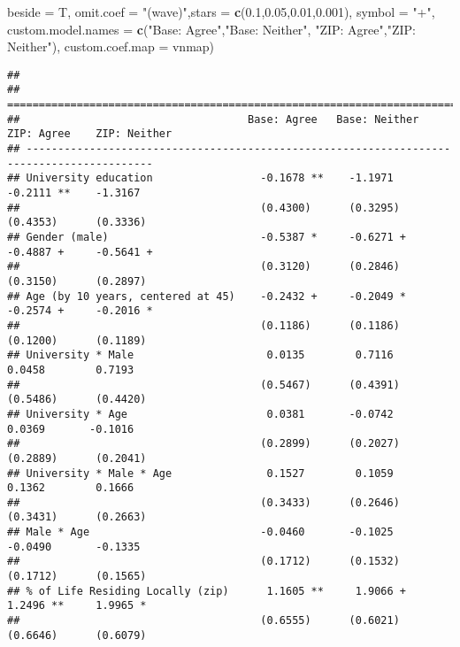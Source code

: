 \documentclass[
]{article}
\newenvironment{Shaded}{\begin{snugshade}}{\end{snugshade}}
\newcommand{\DataTypeTok}[1]{\textcolor[rgb]{0.13,0.29,0.53}{#1}}
\newcommand{\FloatTok}[1]{\textcolor[rgb]{0.00,0.00,0.81}{#1}}
\newcommand{\KeywordTok}[1]{\textcolor[rgb]{0.13,0.29,0.53}{\textbf{#1}}}
\newcommand{\NormalTok}[1]{#1}
\newcommand{\StringTok}[1]{\textcolor[rgb]{0.31,0.60,0.02}{#1}}
\begin{document}
\begin{Shaded}
\begin{Highlighting}[]
          \DataTypeTok{beside =}\NormalTok{ T,}
          \DataTypeTok{omit.coef =} \StringTok{"(wave)"}\NormalTok{,}\DataTypeTok{stars =} \KeywordTok{c}\NormalTok{(}\FloatTok{0.1}\NormalTok{,}\FloatTok{0.05}\NormalTok{,}\FloatTok{0.01}\NormalTok{,}\FloatTok{0.001}\NormalTok{), }\DataTypeTok{symbol =} \StringTok{"+"}\NormalTok{, }
          \DataTypeTok{custom.model.names =} \KeywordTok{c}\NormalTok{(}\StringTok{"Base: Agree"}\NormalTok{,}\StringTok{"Base: Neither"}\NormalTok{,}
                                 \StringTok{"ZIP: Agree"}\NormalTok{,}\StringTok{"ZIP: Neither"}\NormalTok{),}
          \DataTypeTok{custom.coef.map =}\NormalTok{ vnmap)}
\end{Highlighting}
\end{Shaded}

\begin{verbatim}
## 
## ==========================================================================================
##                                    Base: Agree   Base: Neither  ZIP: Agree    ZIP: Neither
## ------------------------------------------------------------------------------------------
## University education                 -0.1678 **    -1.1971        -0.2111 **    -1.3167   
##                                      (0.4300)      (0.3295)       (0.4353)      (0.3336)  
## Gender (male)                        -0.5387 *     -0.6271 +      -0.4887 +     -0.5641 + 
##                                      (0.3120)      (0.2846)       (0.3150)      (0.2897)  
## Age (by 10 years, centered at 45)    -0.2432 +     -0.2049 *      -0.2574 +     -0.2016 * 
##                                      (0.1186)      (0.1186)       (0.1200)      (0.1189)  
## University * Male                     0.0135        0.7116         0.0458        0.7193   
##                                      (0.5467)      (0.4391)       (0.5486)      (0.4420)  
## University * Age                      0.0381       -0.0742         0.0369       -0.1016   
##                                      (0.2899)      (0.2027)       (0.2889)      (0.2041)  
## University * Male * Age               0.1527        0.1059         0.1362        0.1666   
##                                      (0.3433)      (0.2646)       (0.3431)      (0.2663)  
## Male * Age                           -0.0460       -0.1025        -0.0490       -0.1335   
##                                      (0.1712)      (0.1532)       (0.1712)      (0.1565)  
## % of Life Residing Locally (zip)      1.1605 **     1.9066 +       1.2496 **     1.9965 * 
##                                      (0.6555)      (0.6021)       (0.6646)      (0.6079)  

\end{verbatim}
\end{document}
